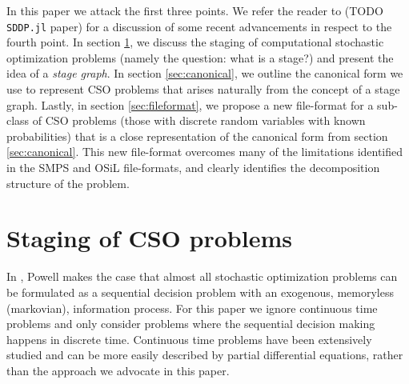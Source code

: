 \documentclass[final,1p,times]{elsarticle}
\begin{document}
In this paper we attack the first three points. We refer the reader to (TODO \texttt{SDDP.jl} paper) for a discussion of some recent advancements in respect to the fourth point. In section \ref{sec:staging}, we discuss the staging of computational stochastic optimization problems (namely the question: what is a stage?) and present the idea of a \emph{stage graph}. In section \ref{sec:canonical}, we outline the canonical form we use to represent CSO problems that arises naturally from the concept of a stage graph. Lastly, in section \ref{sec:fileformat}, we propose a new file-format for a sub-class of CSO problems (those with discrete random variables with known probabilities) that is a close representation of the canonical form from section \ref{sec:canonical}. This new file-format overcomes many of the limitations identified in the SMPS and OSiL file-formats, and clearly identifies the decomposition structure of the problem.

\section{Staging of CSO problems}\label{sec:staging}

In \cite{powell_jungle}, Powell makes the case that almost all stochastic optimization problems can be formulated as a sequential decision problem with an exogenous, memoryless (markovian), information process. For this paper we ignore continuous time problems and only consider problems where the sequential decision making happens in discrete time. Continuous time problems have been extensively studied and can be more easily described by partial differential equations, rather than the approach we advocate in this paper.
\end{document}
